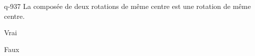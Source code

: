 \begin{truefalse}{q-937}
La composée de deux rotations de même centre est une rotation de même centre.
\item* Vrai
\item Faux
\end{truefalse}

